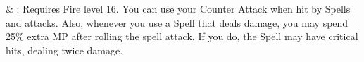 \begin{tabjob}
     & %
    : Requires Fire level 16. You can use your Counter Attack when hit by Spells and  attacks. Also, whenever you use a Spell that deals damage, you may spend 25\% extra MP after rolling the spell attack. If you do, the Spell may have critical hits, dealing twice damage. \\
\end{tabjob}